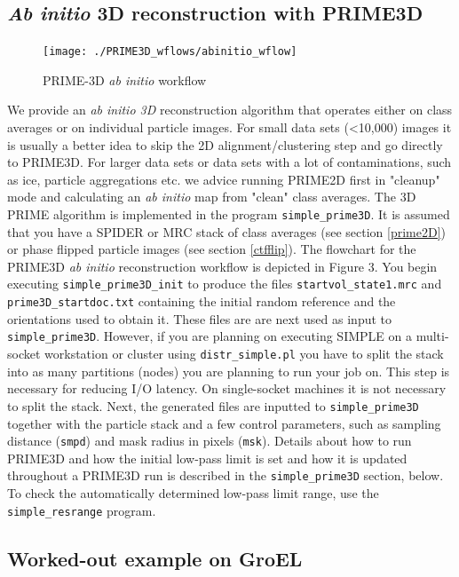 \documentclass[a4paper,11pt]{article}
\newcommand{\prgname}[1]{\textcolor{NavyBlue}{\texttt{#1}}}
\begin{document}
\subsection{\textit{Ab initio} 3D reconstruction with PRIME3D}
\label{prime3D}
\begin{figure}
\texttt{[image: ./PRIME3D\_wflows/abinitio\_wflow]}
\caption{PRIME-3D \textit{ab initio} workflow}
\end{figure}
We provide an \textit{ab initio 3D} reconstruction algorithm that operates either on class averages or on individual particle images. For small data sets (<10,000) images it is usually a better idea to skip the 2D alignment/clustering step and go directly to PRIME3D. For larger data sets or data sets with a lot of contaminations, such as ice, particle aggregations etc. we advice running PRIME2D first in "cleanup" mode and calculating an \textit{ab initio} map from "clean" class averages. The 3D PRIME algorithm is implemented in the program \prgname{simple\_prime3D}. It is assumed that you have a SPIDER or MRC stack of class averages (see section \ref{prime2D}) or phase flipped particle images (see section \ref{ctfflip}). The flowchart for the PRIME3D \textit{ab initio} reconstruction workflow is depicted in Figure 3. You begin executing \prgname{simple\_prime3D\_init} to produce the files \texttt{startvol\_state1.mrc} and \texttt{prime3D\_startdoc.txt} containing the initial random reference and the orientations used to obtain it. These files are are next used as input to \prgname{simple\_prime3D}. However, if you are planning on executing SIMPLE on a multi-socket workstation or cluster using \prgname{distr\_simple.pl} you have to split the stack into as many partitions (nodes) you are planning to run your job on. This step is necessary for reducing I/O latency. On single-socket machines it is not necessary to split the stack. Next, the generated files are inputted to \prgname{simple\_prime3D} together with the particle stack and a few control parameters, such as sampling distance (\texttt{smpd}) and mask radius in pixels (\texttt{msk}). Details about how to run PRIME3D and how the initial low-pass limit is set and how it is updated throughout a PRIME3D run is described in the \prgname{simple\_prime3D} section, below. To check the automatically determined low-pass limit range, use the \prgname{simple\_resrange} program.

\subsection{Worked-out example on GroEL}
\end{document}
